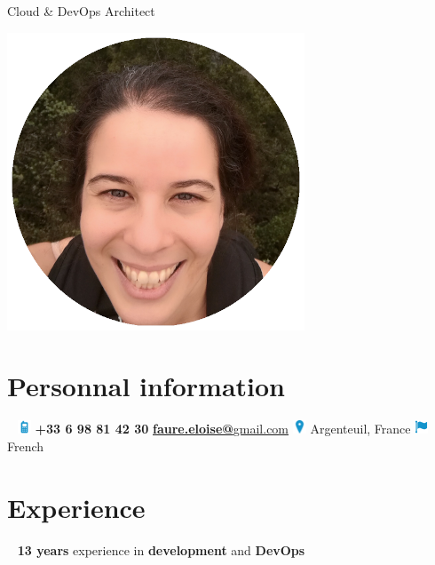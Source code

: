 \documentclass[]{friggeri-cv}
\begin{document}
      {Cloud \& DevOps Architect}
      

\begin{aside}
  \includegraphics[scale=0.36]{img/eloise.png}
  ~
  \section{Personnal information}
  ~
{\includegraphics[width=0.4cm]{img/mobile_icon.pdf}} \textbf{ +33 6 98 81 42 30 }  \vspace{6pt}
%
  \href{mailto:faure.eloise@gmail.com}{\textbf{faure.eloise@}gmail.com}\vspace{4pt}
%
{\includegraphics[width=0.4cm]{img/localisation.png}}  Argenteuil, France \vspace{4pt}
%
{\includegraphics[width=0.4cm]{img/nationality.png}}    \enspace French 
~
    \section{Experience}
    ~
    	\textbf{13 years} experience in 	\textbf{development} and 	\textbf{DevOps}
    	~

\end{aside}
\end{document}
